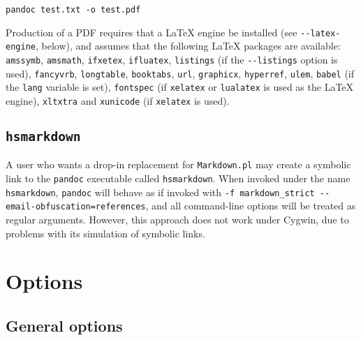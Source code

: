 \documentclass[]{article}
\begin{document}
\begin{verbatim}
pandoc test.txt -o test.pdf
\end{verbatim}

Production of a PDF requires that a LaTeX engine be installed (see
\texttt{-{}-latex-engine}, below), and assumes that the following LaTeX
packages are available: \texttt{amssymb}, \texttt{amsmath},
\texttt{ifxetex}, \texttt{ifluatex}, \texttt{listings} (if the
\texttt{-{}-listings} option is used), \texttt{fancyvrb},
\texttt{longtable}, \texttt{booktabs}, \texttt{url}, \texttt{graphicx},
\texttt{hyperref}, \texttt{ulem}, \texttt{babel} (if the \texttt{lang}
variable is set), \texttt{fontspec} (if \texttt{xelatex} or
\texttt{lualatex} is used as the LaTeX engine), \texttt{xltxtra} and
\texttt{xunicode} (if \texttt{xelatex} is used).

\subsection{\texttt{hsmarkdown}}\label{hsmarkdown}

A user who wants a drop-in replacement for \texttt{Markdown.pl} may
create a symbolic link to the \texttt{pandoc} executable called
\texttt{hsmarkdown}. When invoked under the name \texttt{hsmarkdown},
\texttt{pandoc} will behave as if invoked with
\texttt{-f markdown\_strict -{}-email-obfuscation=references}, and all
command-line options will be treated as regular arguments. However, this
approach does not work under Cygwin, due to problems with its simulation
of symbolic links.

\section{Options}\label{options}

\subsection{General options}\label{general-options}
\end{document}
